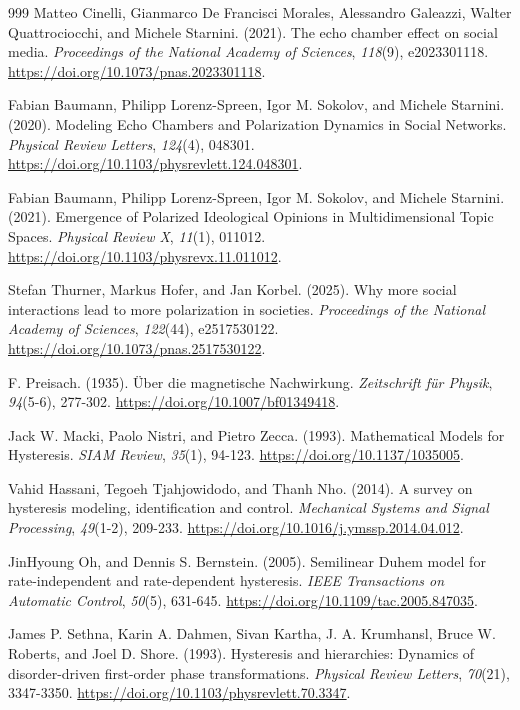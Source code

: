 \begin{thebibliography}{999}
Matteo Cinelli, Gianmarco De Francisci Morales, Alessandro Galeazzi, Walter Quattrociocchi, and Michele Starnini. (2021). The echo chamber effect on social media. \textit{Proceedings of the National Academy of Sciences}, \textit{118}(9), e2023301118. \url{https://doi.org/10.1073/pnas.2023301118}.

Fabian Baumann, Philipp Lorenz-Spreen, Igor M. Sokolov, and Michele Starnini. (2020). Modeling Echo Chambers and Polarization Dynamics in Social Networks. \textit{Physical Review Letters}, \textit{124}(4), 048301. \url{https://doi.org/10.1103/physrevlett.124.048301}.

Fabian Baumann, Philipp Lorenz-Spreen, Igor M. Sokolov, and Michele Starnini. (2021). Emergence of Polarized Ideological Opinions in Multidimensional Topic Spaces. \textit{Physical Review X}, \textit{11}(1), 011012. \url{https://doi.org/10.1103/physrevx.11.011012}.

Stefan Thurner, Markus Hofer, and Jan Korbel. (2025). Why more social interactions lead to more polarization in societies. \textit{Proceedings of the National Academy of Sciences}, \textit{122}(44), e2517530122. \url{https://doi.org/10.1073/pnas.2517530122}.

F. Preisach. (1935). \"{U}ber die magnetische Nachwirkung. \textit{Zeitschrift f\"{u}r Physik}, \textit{94}(5-6), 277-302. \url{https://doi.org/10.1007/bf01349418}.

Jack W. Macki, Paolo Nistri, and Pietro Zecca. (1993). Mathematical Models for Hysteresis. \textit{SIAM Review}, \textit{35}(1), 94-123. \url{https://doi.org/10.1137/1035005}.

Vahid Hassani, Tegoeh Tjahjowidodo, and Thanh Nho. (2014). A survey on hysteresis modeling, identification and control. \textit{Mechanical Systems and Signal Processing}, \textit{49}(1-2), 209-233. \url{https://doi.org/10.1016/j.ymssp.2014.04.012}.

JinHyoung Oh, and Dennis S. Bernstein. (2005). Semilinear Duhem model for rate-independent and rate-dependent hysteresis. \textit{IEEE Transactions on Automatic Control}, \textit{50}(5), 631-645. \url{https://doi.org/10.1109/tac.2005.847035}.

James P. Sethna, Karin A. Dahmen, Sivan Kartha, J. A. Krumhansl, Bruce W. Roberts, and Joel D. Shore. (1993). Hysteresis and hierarchies: Dynamics of disorder-driven first-order phase transformations. \textit{Physical Review Letters}, \textit{70}(21), 3347-3350. \url{https://doi.org/10.1103/physrevlett.70.3347}.


\end{thebibliography}
